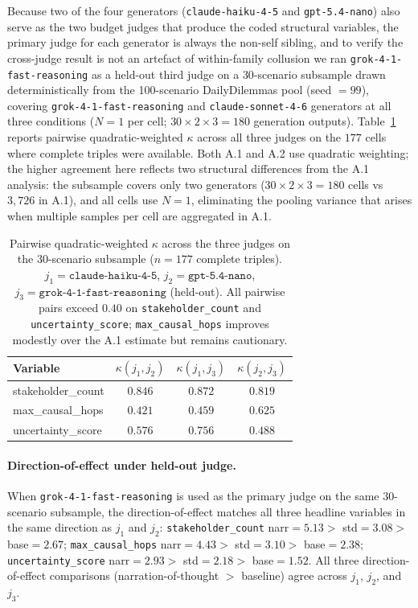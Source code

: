 \documentclass[11pt]{article}
\begin{document}
Because two of the four generators (\texttt{claude-haiku-4-5} and
\texttt{gpt-5.4-nano}) also serve as the two budget judges that produce
the coded structural variables, the primary judge for each generator
is always the non-self sibling, and to verify the cross-judge result
is not an artefact of within-family collusion we ran
\texttt{grok-4-1-fast-reasoning} as a held-out third judge on a
$30$-scenario subsample drawn deterministically from the 100-scenario
DailyDilemmas pool (seed $= 99$), covering
\texttt{grok-4-1-fast-reasoning} and \texttt{claude-sonnet-4-6}
generators at all three conditions ($N{=}1$ per cell;
$30 \times 2 \times 3 = 180$ generation outputs). Table~\ref{tab:kappa3}
reports pairwise quadratic-weighted $\kappa$ across all three judges on
the $177$ cells where complete triples were available.
Both A.1 and A.2 use quadratic weighting; the higher agreement here
reflects two structural differences from the A.1 analysis: the subsample
covers only two generators ($30 \times 2 \times 3 = 180$ cells vs\
$3{,}726$ in A.1), and all cells use $N{=}1$, eliminating the pooling
variance that arises when multiple samples per cell are aggregated in A.1.

\begin{table}[t]
\centering
\small
\begin{tabular}{lccc}
\toprule
Variable & $\kappa(j_1,j_2)$ & $\kappa(j_1,j_3)$ & $\kappa(j_2,j_3)$ \\
\midrule
stakeholder\_count & $0.846$ & $0.872$ & $0.819$ \\
max\_causal\_hops  & $0.421$ & $0.459$ & $0.625$ \\
uncertainty\_score & $0.576$ & $0.756$ & $0.488$ \\
\bottomrule
\end{tabular}
\caption{Pairwise quadratic-weighted $\kappa$ across the three judges on
the 30-scenario subsample ($n = 177$ complete triples). $j_1 =
\texttt{claude-haiku-4-5}$, $j_2 = \texttt{gpt-5.4-nano}$, $j_3 =
\texttt{grok-4-1-fast-reasoning}$ (held-out). All pairwise pairs exceed
$0.40$ on \texttt{stakeholder\_count} and \texttt{uncertainty\_score};
\texttt{max\_causal\_hops} improves modestly over the A.1 estimate
but remains cautionary.}
\label{tab:kappa3}
\end{table}

\paragraph{Direction-of-effect under held-out judge.}
When \texttt{grok-4-1-fast-reasoning} is used as the primary judge on the
same $30$-scenario subsample, the direction-of-effect matches all three
headline variables in the same direction as $j_1$ and $j_2$:
\texttt{stakeholder\_count} narr$=5.13 >$ std$=3.08 >$ base$=2.67$;
\texttt{max\_causal\_hops} narr$=4.43 >$ std$=3.10 >$ base$=2.38$;
\texttt{uncertainty\_score} narr$=2.93 >$ std$=2.18 >$ base$=1.52$.
All three direction-of-effect comparisons (narration-of-thought $>$ baseline)
agree across $j_1$, $j_2$, and $j_3$.
\end{document}
